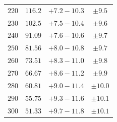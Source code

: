 \begin{table}
\begin{center}
\begin{tabular}{cccc}
$220 $&$ 116.2 $&$ +7.2  -\!10.3 $&$ \pm 9.5  $\\
$230 $&$ 102.5 $&$ +7.5  -\!10.4 $&$ \pm 9.6  $\\
$240 $&$ 91.09 $&$ +7.6  -\!10.6 $&$ \pm 9.7  $\\
$250 $&$ 81.56 $&$ +8.0  -\!10.8 $&$ \pm 9.7  $\\
$260 $&$ 73.51 $&$ +8.3  -\!11.0 $&$ \pm 9.8  $\\
$270 $&$ 66.67 $&$ +8.6  -\!11.2 $&$ \pm 9.9  $\\
$280 $&$ 60.81 $&$ +9.0  -\!11.4 $&$ \pm 10.0 $\\
$290 $&$ 55.75 $&$ +9.3  -\!11.6 $&$ \pm 10.1 $\\
$300 $&$ 51.33 $&$ +9.7  -\!11.8 $&$ \pm 10.1 $\\ \hline
   \end{tabular}
   \end{center}
\end{table}


\clearpage
